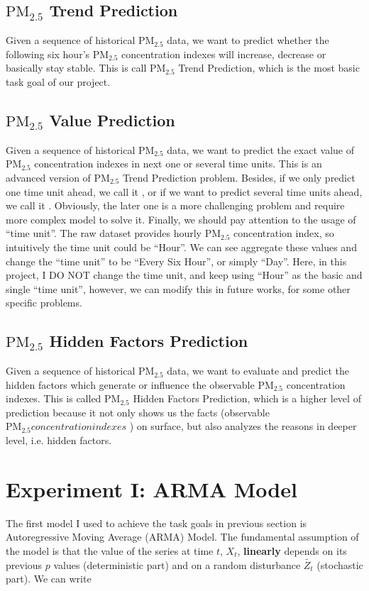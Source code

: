 \documentclass[letterpaper]{article}
\begin{document}
\subsection{$\text{PM}_{2.5}$ Trend Prediction}
Given a sequence of historical $\text{PM}_{2.5}$ data, we want to predict whether the following six hour's $\text{PM}_{2.5}$ concentration indexes will increase, decrease or basically stay stable. This is call $\text{PM}_{2.5}$ Trend Prediction, which is the most basic task goal of our project. 

\subsection{$\text{PM}_{2.5}$ Value Prediction}
Given a sequence of historical $\text{PM}_{2.5}$ data, we want to predict the exact value of $\text{PM}_{2.5}$ concentration indexes in next one or several time units. This is an advanced version of $\text{PM}_{2.5}$ Trend Prediction problem. Besides, if we only predict one time unit ahead, we call it , or if we want to predict several time units ahead, we call it . Obviously, the later one is a more challenging problem and require more complex model to solve it. Finally, we should pay attention to the usage of ``time unit''. The raw dataset provides hourly $\text{PM}_{2.5}$ concentration index, so intuitively the time unit could be ``Hour''. We can see aggregate these values and change the ``time unit'' to be ``Every Six Hour'', or simply ``Day''. Here, in this project, I DO NOT change the time unit, and keep using ``Hour'' as the basic and single ``time unit'', however, we can modify this in future works, for some other specific problems.

\subsection{$\text{PM}_{2.5}$ Hidden Factors Prediction}
Given a sequence of historical $\text{PM}_{2.5}$ data, we want to evaluate and predict the hidden factors which generate or influence the observable $\text{PM}_{2.5}$ concentration indexes. This is called $\text{PM}_{2.5}$ Hidden Factors Prediction, which is a higher level of prediction because it not only shows us the facts (observable $\text{PM}_{2.5} concentration indexes$ ) on surface, but also analyzes the reasons in deeper level, i.e. hidden factors.

\section{Experiment I: ARMA Model}
The first model I used to achieve the task goals in previous section is Autoregressive Moving Average (ARMA) Model. The fundamental assumption of the model is that the value of the series at time $t$, $X_{t}$, \textbf{linearly} depends on its previous $p$ values (deterministic part) and on a random disturbance $\tilde{Z_{t}}$ (stochastic part). We can write
\end{document}
